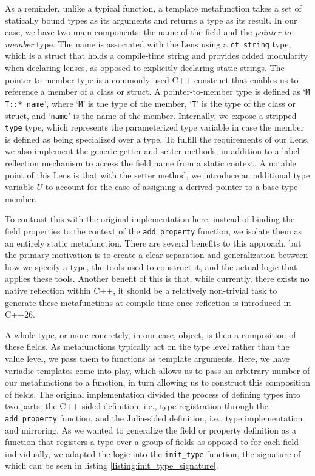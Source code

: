 \begin{listing}[ht!]
  
  \caption{(Template) Field Type meta-function}
  \label{listing:type_meta_func}
\end{listing}

As a reminder, unlike a typical function, a template metafunction takes a set of statically bound types as its arguments and returns a type as its result. In our case, we have two main components: the name of the field and the \textit{pointer-to-member} type. The name is associated with the Lens using a \texttt{ct\_string} type, which is a struct that holds a compile-time string and provides added modularity when declaring lenses, as opposed to explicitly declaring static strings. The pointer-to-member type is a commonly used C++ construct that enables us to reference a member of a class or struct. A pointer-to-member type is defined as `\texttt{M T::* name}', where `\texttt{M}' is the type of the member, `\texttt{T}' is the type of the class or struct, and `\texttt{name}' is the name of the member. Internally, we expose a stripped \texttt{type} type, which represents the parameterized type variable in case the member is defined as being specialized over a type. To fulfill the requirements of our Lens, we also implement the generic getter and setter methods, in addition to a label reflection mechanism to access the field name from a static context. A notable point of this Lens is that with the setter method, we introduce an additional type variable $U$ to account for the case of assigning a derived pointer to a base-type member. 

To contrast this with the original implementation here, instead of binding the field properties to the context of the \texttt{add\_property} function, we isolate them as an entirely static metafunction. There are several benefits to this approach, but the primary motivation is to create a clear separation and generalization between how we specify a type, the tools used to construct it, and the actual logic that applies these tools. Another benefit of this is that, while currently, there exists no native reflection within C++, it should be a relatively non-trivial task to generate these metafunctions at compile time once reflection is introduced in C++26.

A whole type, or more concretely, in our case, object, is then a composition of these fields. As metafunctions typically act on the type level rather than the value level, we pass them to functions as template arguments. Here, we have variadic templates come into play, which allows us to pass an arbitrary number of our metafunctions to a function, in turn allowing us to construct this composition of fields. The original implementation divided the process of defining types into two parts: the C++-sided definition, i.e., type registration through the \texttt{add\_property} function, and the Julia-sided definition, i.e., type implementation and mirroring. As we wanted to generalize the field or property definition as a function that registers a type over a group of fields as opposed to for each field individually, we adapted the logic into the \texttt{init\_type} function, the signature of which can be seen in listing \ref{listing:init_type_signature}.

